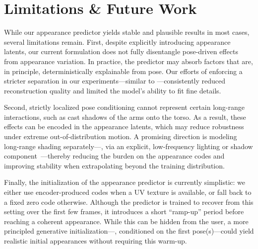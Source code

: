 \documentclass[runningheads]{llncs}
\begin{document}


\section{Limitations \& Future Work}

While our appearance predictor yields stable and plausible results in most cases, several limitations remain.
First, despite explicitly introducing appearance latents, our current formulation does not fully disentangle pose-driven effects from appearance variation.
In practice, the predictor may absorb factors that are, in principle, deterministically explainable from pose.
Our efforts of enforcing a stricter separation in our experiments---similar to \cite{bagautdinov2021drivingsignal}---consistently reduced reconstruction quality and limited the model's ability to fit fine details.

Second, strictly localized pose conditioning cannot represent certain long-range interactions, such as cast shadows of the arms onto the torso.
As a result, these effects can be encoded in the appearance latents, which may reduce robustness under extreme out-of-distribution motion.
A promising direction is modeling long-range shading separately---\eg, via an explicit, low-frequency lighting or shadow component~\cite{wang2025relightable}---thereby reducing the burden on the appearance codes and improving stability when extrapolating beyond the training distribution.

Finally, the initialization of the appearance predictor is currently simplistic: we either use encoder-produced codes when a UV texture is available, or fall back to a fixed zero code otherwise.
Although the predictor is trained to recover from this setting over the first few frames, it introduces a short ``ramp-up'' period before reaching a coherent appearance.
While this can be hidden from the user, a more principled generative initialization---\eg, conditioned on the first pose(s)---could yield realistic initial appearances without requiring this warm-up.
\end{document}
